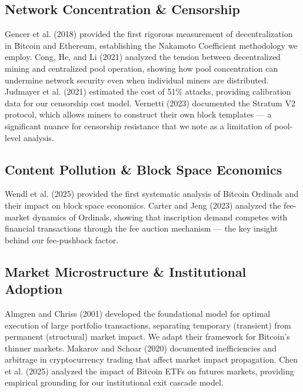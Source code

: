 \documentclass[
  11pt,
]{article}
\let\oldsubsection\subsection
\renewcommand{\subsection}[1]{\FloatBarrier\oldsubsection{#1}}
\begin{document}
\hypertarget{network-concentration-censorship}{%
\subsection{Network Concentration \&
Censorship}\label{network-concentration-censorship}}

Gencer et al. (2018) provided the first rigorous measurement of
decentralization in Bitcoin and Ethereum, establishing the Nakamoto
Coefficient methodology we employ. Cong, He, and Li (2021) analyzed the
tension between decentralized mining and centralized pool operation,
showing how pool concentration can undermine network security even when
individual miners are distributed. Judmayer et al. (2021) estimated the
cost of 51\% attacks, providing calibration data for our censorship cost
model. Vernetti (2023) documented the Stratum V2 protocol, which allows
miners to construct their own block templates --- a significant nuance
for censorship resistance that we note as a limitation of pool-level
analysis.

\hypertarget{content-pollution-block-space-economics}{%
\subsection{Content Pollution \& Block Space
Economics}\label{content-pollution-block-space-economics}}

Wendl et al. (2025) provided the first systematic analysis of Bitcoin
Ordinals and their impact on block space economics. Carter and Jeng
(2023) analyzed the fee-market dynamics of Ordinals, showing that
inscription demand competes with financial transactions through the fee
auction mechanism --- the key insight behind our fee-pushback factor.

\hypertarget{market-microstructure-institutional-adoption}{%
\subsection{Market Microstructure \& Institutional
Adoption}\label{market-microstructure-institutional-adoption}}

Almgren and Chriss (2001) developed the foundational model for optimal
execution of large portfolio transactions, separating temporary
(transient) from permanent (structural) market impact. We adapt their
framework for Bitcoin's thinner markets. Makarov and Schoar (2020)
documented inefficiencies and arbitrage in cryptocurrency trading that
affect market impact propagation. Chen et al. (2025) analyzed the impact
of Bitcoin ETFs on futures markets, providing empirical grounding for
our institutional exit cascade model.
\end{document}
